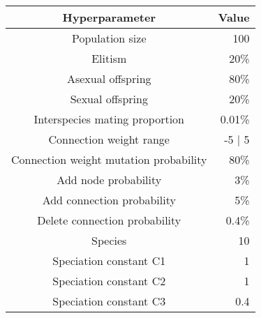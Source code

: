 

\begin{minipage}{\textwidth}
\vspace{4mm}
\begin{center}

\label{tab:neat-hyperparams} 

	\begin{tabular}{| c | r |}
		\hline
	
		\textbf{Hyperparameter} & \textbf{Value} \\ \hline
		Population size & 100 \\ \hline
		Elitism & 20\% \\ \hline
		Asexual offspring & 80\% \\ \hline
		Sexual offspring & 20\% \\ \hline
		Interspecies mating proportion & 0.01\% \\ \hline
		Connection weight range & -5 | 5 \\ \hline
		Connection weight mutation probability & 80\% \\ \hline
		Add node probability & 3\% \\ \hline
		Add connection probability & 5\% \\ \hline
		Delete connection probability & 0.4\% \\ \hline
		Species & 10 \\ \hline
		Speciation constant C1 & 1 \\ \hline
		Speciation constant C2 & 1 \\ \hline
		Speciation constant C3 & 0.4 \\ \hline
		
	\end{tabular}
\end{center}
\end{minipage}
